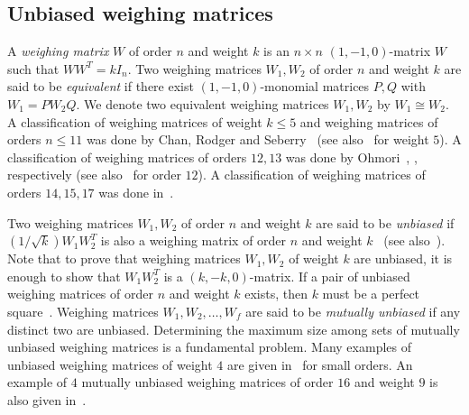 \documentclass[12pt]{article}
\theoremstyle{remark}
\begin{document}
\subsection{Unbiased weighing matrices}
A \emph{weighing matrix} $W$ of order $n$ and weight $k$ is an 
$n \times n$ $(1,-1,0)$-matrix $W$ such that $W W^T=kI_n$.
Two weighing matrices $W_1,W_2$ of order $n$ and weight $k$ are said to be 
\emph{equivalent} if there exist $(1,-1,0)$-monomial matrices $P, Q$ with 
$W_1=P W_2 Q$. 
We denote two equivalent weighing matrices $W_1,W_2$ by $W_1 \cong W_2$.
A classification of weighing matrices of weight $k \le 5$ and 
weighing matrices of orders $n \le 11$ was done by Chan, Rodger and Seberry~\cite{CRS86}
(see also~\cite{HM} for weight $5$).
A classification of weighing matrices of orders $12, 13$
was done by Ohmori~\cite{O89}, \cite{O93}, respectively
(see also~\cite{HM} for order $12$).
A classification of weighing matrices of orders $14, 15, 17$ was done 
in~\cite{HM}.


Two weighing matrices $W_1,W_2$ of order $n$ and weight $k$ are said to be 
\emph{unbiased} if $(1/\sqrt{k})W_1 W_2^{T}$ is also 
a weighing matrix of order $n$ and weight $k$~\cite{HKO} (see also~\cite{BKR}).
Note that to prove that weighing matrices $W_1, W_2$ of weight $k$ are
unbiased, it is enough to show that $W_1W_2^T$ is a $(k,-k,0)$-matrix.
If a pair of unbiased weighing matrices of order $n$ and weight $k$ exists,
then $k$ must be a perfect square~\cite{BKR}.
Weighing matrices $W_1,W_2,\ldots,W_f$ are said to be 
\emph{mutually unbiased} if any distinct two are unbiased.
Determining the
maximum size among sets of mutually unbiased weighing matrices is a fundamental problem.
Many examples of unbiased weighing matrices of weight $4$ are given in~\cite{BKR}
for small orders.
An example of $4$ mutually unbiased weighing matrices of order $16$ and
weight $9$ is also given in~\cite{HKO}.
\end{document}

